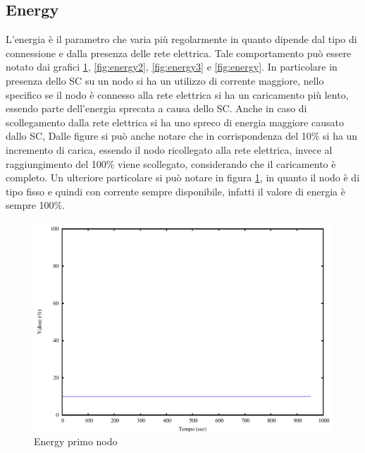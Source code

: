 \subsection{Energy}
L'energia è il parametro che varia più regolarmente in quanto dipende dal tipo di connessione e dalla presenza delle rete elettrica. Tale comportamento può essere notato dai grafici \ref{fig:energy1}, \ref{fig:energy2}, \ref{fig:energy3} e \ref{fig:energy}. In particolare in presenza dello SC su un nodo si ha un utilizzo di corrente maggiore, nello specifico se il nodo è connesso alla rete elettrica si ha un caricamento più lento, essendo parte dell'energia sprecata a causa dello SC. Anche in caso di scollegamento dalla rete elettrica si ha uno spreco di energia maggiore causato dallo SC, Dalle figure si può anche notare che in corrispondenza del 10\% si ha un incremento di carica, essendo il nodo ricollegato alla rete elettrica, invece al raggiungimento del 100\% viene scollegato, considerando che il caricamento è completo. Un ulteriore particolare si può notare in figura \ref{fig:energy1}, in quanto il nodo è di tipo fisso e quindi con corrente sempre disponibile, infatti il valore di energia è sempre 100\%.
\begin{figure}[H]
\begin{center}
\includegraphics[scale=0.6]{etc/energy1.pdf}
\caption{Energy primo nodo}
\label{fig:energy1}
\end{center}
\end{figure}
